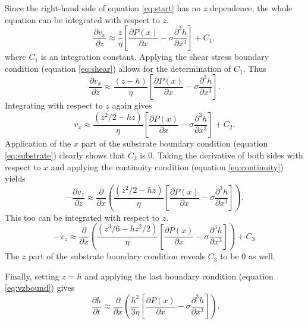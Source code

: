 \documentclass[twocolumn,showpacs,preprintnumbers,amsmath,amssymb]{revtex4}
\begin{document}
Since the right-hand side of equation \ref{eq:start} has no $z$ dependence, the whole
equation can be integrated with respect to $z$.
\begin{equation}
\frac{\partial v_x}{\partial z}  \approx \frac{z}{\eta}\left[\frac{\partial
P(x)}{\partial x}-\sigma\frac{\partial^3 h}{\partial x^3}\right]+C_1 \mathrm{,}
\end{equation}
where $C_1$ is an integration constant. Applying the shear stress boundary condition
(equation \ref{eq:shear}) allows for the determination of $C_1$. Thus
\begin{equation}
\frac{\partial v_x}{\partial z} \approx \frac{\left(z-h\right)}{\eta}\left[\frac{\partial
P(x)}{\partial x}-\sigma\frac{\partial^3 h}{\partial x^3}\right] \mathrm{.}
\end{equation}
Integrating with respect to $z$ again gives
\begin{equation}
v_x \approx \frac{\left(z^2/2-hz\right)}{\eta}\left[\frac{\partial P(x)}{\partial
x}-\sigma\frac{\partial^3 h}{\partial x^3}\right]+C_2 \mathrm{.}
\end{equation}
Application of the $x$ part of the substrate boundary condition (equation
\ref{eq:substrate}) clearly shows that $C_2$ is 0. Taking the derivative of both sides
with respect to $x$ and applying the continuity condition (equation \ref{eq:continuity})
yields
\begin{equation}
-\frac{\partial v_z}{\partial z}  \approx \frac{\partial}{\partial x}
\left(\frac{\left(z^2/2-hz\right)}{\eta}\left[\frac{\partial P(x)}{\partial
x}-\sigma\frac{\partial^3 h}{\partial x^3}\right]\right) \mathrm{.}
\end{equation}
This too can be integrated with respect to $z$.
\begin{equation}
-v_z \approx \frac{\partial}{\partial
x}\left(\frac{\left(z^3/6-hz^2/2\right)}{\eta}\left[\frac{\partial P(x)}{\partial
x}-\sigma\frac{\partial^3 h}{\partial x^3}\right]\right)+C_3 \label{eq:almost}
\end{equation}
The $z$ part of the substrate boundary condition reveals $C_3$ to be $0$ as well.

Finally, setting $z = h$ and applying the last boundary condition (equation
\ref{eq:vzbound}) gives
\begin{equation}\
\frac{\partial h}{\partial t} \approx \frac{\partial}{\partial
x}\left(\frac{h^3}{3\eta}\left[\frac{\partial P(x)}{\partial x}-\sigma\frac{\partial^3
h}{\partial x^3}\right]\right) \mathrm{.} \label{eq:last}
\end{equation}
\end{document}
